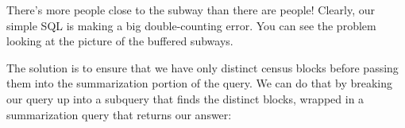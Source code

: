 \documentclass[a4paper,11pt,english]{sphinxmanual}
\begin{document}
\begin{sphinxVerbatim}[commandchars=\\\{\}]
 
  
  
   
\end{sphinxVerbatim}

\begin{sphinxVerbatim}[commandchars=\\\{\}]
\end{sphinxVerbatim}

There’s more people close to the subway than there are people! Clearly, our simple SQL is making a big double-counting error. You can see the problem looking at the picture of the buffered subways.

\noindent{}

The solution is to ensure that we have only distinct census blocks before passing them into the summarization portion of the query. We can do that by breaking our query up into a subquery that finds the distinct blocks, wrapped in a summarization query that returns our answer:

\begin{sphinxVerbatim}[commandchars=\\\{\}]
   
      
    
    
     
 
 
\end{sphinxVerbatim}

\begin{sphinxVerbatim}[commandchars=\\\{\}]
\end{sphinxVerbatim}
\end{document}
